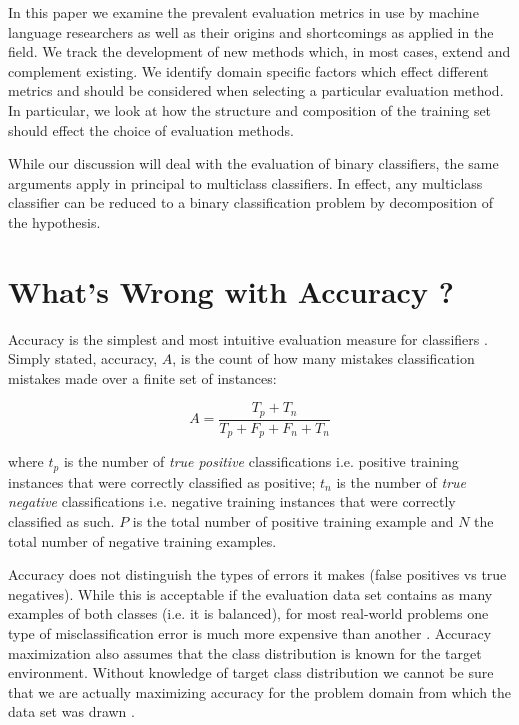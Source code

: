 \documentclass[10pt]{unbthesis}
\begin{document}
In this paper we examine the prevalent evaluation metrics in use by
machine language researchers as well as their origins and shortcomings as
applied in the field. We track the development of new methods which,
in most cases, extend and complement existing. We identify domain
specific factors which effect different metrics and should be
considered when selecting a particular evaluation method. In
particular, we look at how the structure and composition of the
training set should effect the choice of evaluation methods.

While our discussion will deal with the evaluation of binary
classifiers, the same arguments apply in principal to multiclass
classifiers. In effect, any multiclass classifier can be reduced to a
binary classification problem by decomposition of the hypothesis. 


\section{What's Wrong with Accuracy ?}
Accuracy is the simplest and most intuitive evaluation measure for
classifiers \cite{RefWorks:43}. Simply stated, accuracy, \(A\), is the
count of how many mistakes classification mistakes made over a finite
set of instances:

\begin{equation}
\label{equ:accuracy}
A = \frac{T_p + T_n}{T_p + F_p + F_n + T_n}
\end{equation}

where \(t_p\) is the number of \textit{true positive} classifications
i.e. positive training instances that were correctly classified as
positive; \(t_n\) is the number of \textit{true negative}
classifications i.e. negative training instances that were correctly
classified as such. \(P\) is the total number of positive training
example and \(N\) the total number of negative training examples.

Accuracy does not distinguish the types of errors it makes (false
positives vs true negatives). While this is acceptable if the evaluation
data set contains as many examples of both classes (i.e. it is
balanced), for most real-world problems one type of misclassification
error is much more expensive than another \cite{RefWorks:45}. Accuracy
maximization also assumes that the class distribution is known for the
target environment. Without knowledge of target class distribution we
cannot be sure that we are actually maximizing accuracy for the
problem domain from which the data set was drawn \cite{RefWorks:45}.
\end{document}
